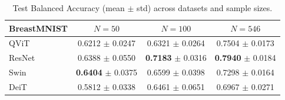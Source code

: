 \begin{table}[htbp]
\centering
\caption{Test Balanced Accuracy (mean $\pm$ std) across datasets and sample sizes.}
\label{tab:test_balacc}
\begin{tabular}{lccc}
\toprule
\textbf{BreastMNIST} & $N = 50$ & $N = 100$ & $N = 546$ \\
\midrule
QViT & 0.6212 $\pm$ 0.0247 & 0.6321 $\pm$ 0.0264 & 0.7504 $\pm$ 0.0173 \\
ResNet & 0.6388 $\pm$ 0.0550 & \textbf{0.7183} $\pm$ 0.0316 & \textbf{0.7940} $\pm$ 0.0184 \\
Swin & \textbf{0.6404} $\pm$ 0.0375 & 0.6599 $\pm$ 0.0398 & 0.7298 $\pm$ 0.0164 \\
DeiT & 0.5812 $\pm$ 0.0338 & 0.6461 $\pm$ 0.0651 & 0.6967 $\pm$ 0.0271 \\
\bottomrule
\end{tabular}
\end{table}
